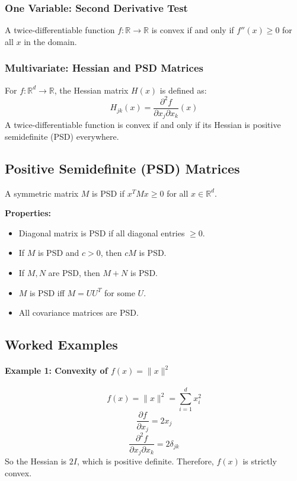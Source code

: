 \documentclass{article}
\begin{document}
\subsubsection*{One Variable: Second Derivative Test}
A twice-differentiable function $f: \mathbb{R} \rightarrow \mathbb{R}$ is convex if and only if $f''(x) \geq 0$ for all $x$ in the domain.

\subsubsection*{Multivariate: Hessian and PSD Matrices}
For $f: \mathbb{R}^d \rightarrow \mathbb{R}$, the Hessian matrix $H(x)$ is defined as:
\[
H_{jk}(x) = \frac{\partial^2 f}{\partial x_j \partial x_k}(x)
\]
A twice-differentiable function is convex if and only if its Hessian is positive semidefinite (PSD) everywhere.

\subsection{Positive Semidefinite (PSD) Matrices}
A symmetric matrix $M$ is PSD if $x^T M x \geq 0$ for all $x \in \mathbb{R}^d$.

\textbf{Properties:}
\begin{itemize}
    \item Diagonal matrix is PSD if all diagonal entries $\geq 0$.
    \item If $M$ is PSD and $c > 0$, then $cM$ is PSD.
    \item If $M, N$ are PSD, then $M + N$ is PSD.
    \item $M$ is PSD iff $M = UU^T$ for some $U$.
    \item All covariance matrices are PSD.
\end{itemize}

\subsection{Worked Examples}

\paragraph{Example 1: Convexity of $f(x) = \|x\|^2$}
\[
f(x) = \|x\|^2 = \sum_{i=1}^d x_i^2
\]
\[
\frac{\partial f}{\partial x_j} = 2x_j
\]
\[
\frac{\partial^2 f}{\partial x_j \partial x_k} = 2\delta_{jk}
\]
So the Hessian is $2I$, which is positive definite. Therefore, $f(x)$ is strictly convex.
\end{document}

